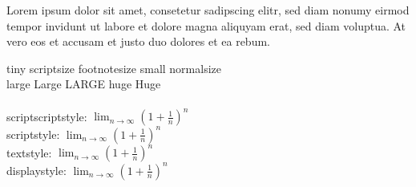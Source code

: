 \documentclass[a5paper]{book}
\begin{document}
Lorem ipsum dolor sit amet, consetetur sadipscing elitr, sed diam 
nonumy eirmod tempor invidunt ut labore et dolore magna aliquyam 
erat, 
sed diam voluptua. At vero eos et accusam et justo duo dolores et ea 
rebum. 

\noindent \tiny tiny
\scriptsize scriptsize
\footnotesize footnotesize
\small small
\normalsize normalsize \\
\large large
\Large Large
\LARGE LARGE
\huge huge
\Huge Huge\\
\\

\normalsize 
\noindent
scriptscriptstyle: $\scriptscriptstyle \lim_{n \rightarrow \infty} (1 + \frac{1}{n})^n$ \\
scriptstyle: $\scriptstyle \lim_{n \rightarrow \infty} (1 + \frac{1}{n})^n$ \\
textstyle: $\textstyle \lim_{n \rightarrow \infty} (1 + \frac{1}{n})^n$ \\
displaystyle: $\displaystyle \lim_{n \rightarrow \infty} (1 + \frac{1}{n})^n$ \\
\end{document}
